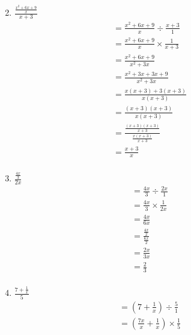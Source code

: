 \documentclass{article}
\begin{document}
\begin{description}
\begin{enumerate}
\begin{equation}
                  \end{equation}
            \item $\frac{\frac{x^2+6x+9}{x}}{x+3}$
                  \begin{equation}
                      \begin{split}
                          & = \frac{x^2+6x+9}{x} \div \frac{x+3}{1}\\
                          & = \frac{x^2+6x+9}{x} \times \frac{1}{x+3}\\
                          & = \frac{x^2 + 6x + 9}{x^2 + 3x}\\
                          & = \frac{x^2 +3x + 3x +9}{x^2+3x}\\
                          & = \frac{x(x+3)+3(x+3)}{x(x+3)}\\
                          & = \frac{(x+3)(x+3)}{x(x+3)} \\
                          & = \frac{\frac{(x+3)(x+3)}{x+3}}{\frac{x(x+3)}{x+3}} \\
                          & = \frac{x+3}{x}\\
                      \end{split}
                  \end{equation}
            \item $\frac{\frac{4x}{3}}{2x}$
                  \begin{equation}
                      \begin{split}
                          & = \frac{4x}{3} \div \frac{2x}{1}\\
                          & = \frac{4x}{3} \times \frac{1}{2x}\\
                          & = \frac{4x}{6x}\\
                          & = \frac{\frac{4x}{2}}{\frac{6x}{2}} \\
                          & = \frac{2x}{3x}\\
                          & = \frac{2}{3}\\
                      \end{split}
                  \end{equation}
            \item $\frac{7 + \frac{1}{x}}{5}$
                  \begin{equation}
                      \begin{split}
                          & = (7+\frac{1}{x}) \div \frac{5}{1}\\
                          & = (\frac{7x}{x}+\frac{1}{x}) \times \frac{1}{5}\\

\end{split}
\end{equation}
\end{enumerate}
\end{description}
\end{document}
